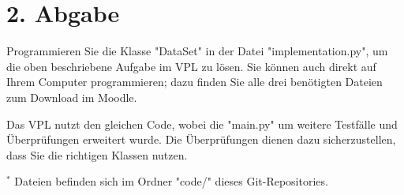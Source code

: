 \documentclass[a4paper,12pt]{article}
\begin{document}
\section{2. Abgabe}
\justify
Programmieren Sie die Klasse "DataSet" in der Datei "implementation.py", um die oben beschriebene Aufgabe im VPL zu l\"osen. Sie k\"onnen auch direkt auf Ihrem Computer programmieren; dazu finden Sie alle drei ben\"otigten Dateien zum Download im Moodle.

Das VPL nutzt den gleichen Code, wobei die "main.py" um weitere Testf\"alle und \"Uberpr\"ufungen erweitert wurde. Die \"Uberpr\"ufungen dienen dazu sicherzustellen, dass Sie die richtigen Klassen nutzen.

\vspace{1cm}
\hrulefill
\vspace{0.5cm}
\footnotesize $^*$ Dateien befinden sich im Ordner "code/" dieses Git-Repositories.
\end{document}
